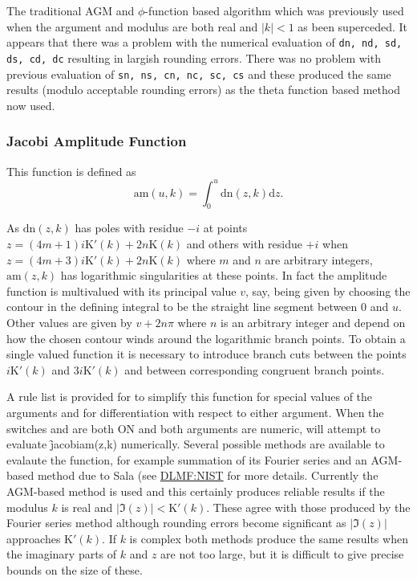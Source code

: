 The traditional AGM and  $\phi$-function based algorithm which was previously
used when the argument and modulus are both real and $|k| < 1$ as been
superceded. It appears that there was a problem with the numerical evaluation
of \texttt{dn, nd, sd, ds, cd, dc} resulting in largish rounding errors. There
was no problem with previous evaluation of \texttt{sn, ns, cn, nc, sc, cs} and
these produced the same results (modulo acceptable rounding errors) as the
theta function based method now used.

\subsubsection{Jacobi Amplitude Function}
\hypertarget{operator:JACOBIAM}{}
This function is defined as
\[ \mathrm{am}(u,k) = \int_0^u\mathrm{dn}(z,k)\mathrm{d}z.\]

As $\mathrm{dn}(z,k)$ has poles with residue $-i$ at points
$z=(4m+1)i\mathrm{K}'(k)+2n\mathrm{K}(k)$ and others with residue $+i$ when
$z=(4m+3)i\mathrm{K}'(k)+2n\mathrm{K}(k)$ where $m$ and $n$ are arbitrary
integers, $\mathrm{am}(z,k)$ has logarithmic singularities at these points.
In fact the amplitude function is multivalued with its principal value $v$, say,
being given by choosing the contour in the defining integral to be the
straight line segment between $0$ and $u$.  Other values are given by $v+2n\pi$
where $n$ is an arbitrary integer and depend on how the chosen contour winds
around the logarithmic branch points.  To obtain a single valued function it is
necessary to introduce branch cuts between the points $i\mathrm{K}'(k)$ and
$3i\mathrm{K}'(k)$ and between corresponding congruent branch points.

A rule list is provided for to simplify this function for special values of the
arguments and for differentiation with respect to either argument.
When the switches  and  are both ON and both arguments
are numeric, \REDUCE will attempt to evaluate \f{jacobiam(z,k)} numerically.
Several possible methods are available to
evalaute the function, for example summation of its Fourier series and an
AGM-based method due to Sala (see \href{https://dlmf.nist.gov/22.20#vi}
{DLMF:NIST} for more details.
Currently the AGM-based method is used and this certainly produces reliable
results if the modulus $k$ is real and $|\Im(z)| < \mathrm{K}'(k)$. These
agree with those produced by the Fourier series method although rounding errors
become significant as $|\Im(z)|$ approaches $\mathrm{K}'(k)$.  If $k$ is complex
both methods produce the same results when the imaginary parts of $k$ and $z$
are not too large, but it is difficult to give precise bounds on the size of
these.

